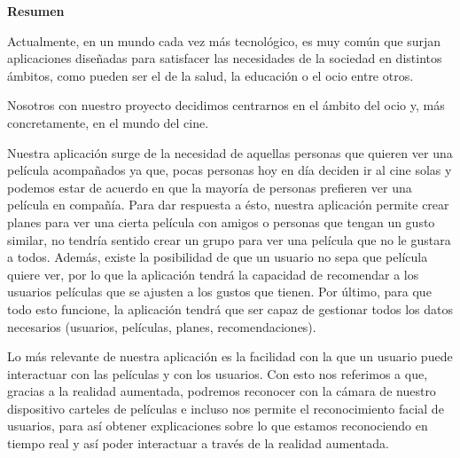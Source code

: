 
\newpage

\thispagestyle{empty}

\begin{center}

{\bf \Huge Resumen}

  \end{center}
\vspace{1cm}

Actualmente, en un mundo cada vez más tecnológico, es muy común que surjan aplicaciones diseñadas
para satisfacer las necesidades de la sociedad en distintos ámbitos, como pueden ser el de la salud, la educación o el ocio entre otros.

Nosotros con nuestro proyecto decidimos centrarnos en el ámbito del ocio y, más concretamente, en el mundo del cine.

Nuestra aplicación surge de la necesidad de aquellas personas que quieren ver una película acompañados ya que, pocas personas hoy en día deciden ir al cine solas y 
podemos estar de acuerdo en que la mayoría de personas prefieren ver una película en compañía.
Para dar respuesta a ésto, nuestra aplicación permite crear planes para ver una cierta película con amigos o personas que tengan un gusto similar, no tendría sentido crear un grupo para ver una película que no le gustara a todos.
Además, existe la posibilidad de que un usuario no sepa que película quiere ver, por lo que la aplicación tendrá la capacidad
de recomendar a los usuarios películas que se ajusten a los gustos que tienen. Por último, para que todo esto funcione, la aplicación tendrá que ser capaz de 
gestionar todos los datos necesarios (usuarios, películas, planes, recomendaciones).

Lo más relevante de nuestra aplicación es la facilidad con la que un usuario puede interactuar con las películas y con los usuarios. Con esto nos referimos a que, gracias a la realidad aumentada,
podremos reconocer con la cámara de nuestro dispositivo carteles de películas e incluso nos permite el reconocimiento facial de usuarios, para así
obtener explicaciones sobre lo que estamos reconociendo en tiempo real y así poder interactuar a 
través de la realidad aumentada.
\vspace{1cm}


